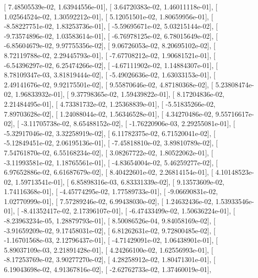 \documentclass{article}
\begin{document}
       [  7.48505539e-02,   1.63944556e-01],
       [  3.64720383e-02,   1.46011118e-01],
       [  1.02564524e-02,   1.30592212e-01],
       [  5.12051501e-02,   1.80659956e-01],
       [ -8.58227751e-02,   1.83253736e-01],
       [ -5.59695671e-02,   5.03215144e-02],
       [ -9.73574896e-02,   1.03583614e-01],
       [ -6.76978125e-02,   6.78015649e-02],
       [ -6.85604679e-02,   9.97755356e-02],
       [  9.06726053e-02,   8.20695102e-02],
       [  8.72119788e-02,   2.29445793e-01],
       [ -7.67708212e-02,   1.90681521e-01],
       [ -6.54396297e-02,   6.25474266e-02],
       [ -4.67111902e-02,   1.14884307e-01],
       [  8.78109347e-03,   3.81819444e-02],
       [ -5.49026636e-02,   1.63033153e-01],
       [  2.49141676e-02,   9.92175501e-02],
       [  9.55870646e-02,   4.87180368e-02],
       [  5.23808474e-02,   1.96833932e-01],
       [  9.37798365e-02,   1.59439822e-01],
       [  8.17204836e-02,   2.21484495e-01],
       [  4.73381732e-02,   1.25368839e-01],
       [ -5.51835266e-02,   7.89703628e-02],
       [  1.24088044e-02,   1.56346528e-01],
       [  4.34270486e-02,   9.55716617e-02],
       [ -3.11705738e-02,   8.65488152e-02],
       [ -1.76220906e-03,   2.29255081e-01],
       [ -5.32917046e-02,   3.32258919e-02],
       [  6.11782375e-02,   6.71520041e-02],
       [ -5.12849451e-02,   2.06195136e-01],
       [ -7.45818810e-02,   3.89810789e-02],
       [  7.54761870e-02,   6.55168234e-02],
       [  3.08267722e-02,   1.80522062e-01],
       [ -3.11993581e-02,   1.18765561e-01],
       [ -4.83654004e-02,   5.46259277e-02],
       [  6.97652886e-02,   6.61687679e-02],
       [  8.40422601e-02,   2.26814154e-01],
       [  4.10148523e-02,   1.59713541e-01],
       [  6.85898316e-03,   6.83331339e-02],
       [  9.13573609e-02,   1.74116368e-01],
       [ -4.45774295e-02,   1.77589733e-01],
       [ -9.06690831e-02,   1.02770999e-01],
       [  7.57289246e-02,   6.99438030e-02],
       [  1.24632436e-02,   1.53933546e-01],
       [ -8.41352417e-02,   2.17396107e-01],
       [ -6.47433499e-02,   1.50636224e-01],
       [ -8.23963234e-05,   1.28879793e-01],
       [  8.50086526e-04,   9.84058169e-02],
       [ -3.91659209e-02,   9.17458031e-02],
       [  6.81262631e-02,   9.72800485e-02],
       [ -1.16701568e-03,   2.12796437e-01],
       [ -4.71429091e-02,   1.06438901e-01],
       [  5.89037109e-03,   2.21891428e-01],
       [  4.24266100e-02,   1.62556993e-01],
       [ -8.17253769e-02,   3.90277270e-02],
       [  4.28258912e-02,   1.80471301e-01],
       [  6.19043698e-02,   4.91367816e-02],
       [ -2.62762733e-02,   1.37460019e-01],
\end{document}
